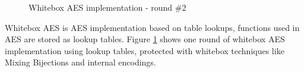 \documentclass[11pt,oneside,final]{fithesis2}
\begin{document}
		\begin{figure}
		\begin{center}
		\leavevmode
		\centerline{}
		\end{center}
		\caption{Whitebox AES implementation - round \#2}
		\label{fig:wbaes}
		\end{figure}

	Whitebox AES is AES implementation based on table lookups, functions used in AES are stored as lookup tables. Figure \ref{fig:wbaes} shows one round of whitebox AES
	implementation using lookup tables, protected with whitebox techniques like Mixing Bijections and internal encodings.
\end{document}
